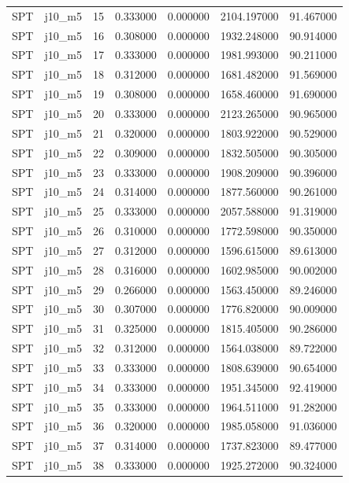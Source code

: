 \begin{tabular}{llrrrrr}
SPT & j10_m5 & 15 & 0.333000 & 0.000000 & 2104.197000 & 91.467000 \\
SPT & j10_m5 & 16 & 0.308000 & 0.000000 & 1932.248000 & 90.914000 \\
SPT & j10_m5 & 17 & 0.333000 & 0.000000 & 1981.993000 & 90.211000 \\
SPT & j10_m5 & 18 & 0.312000 & 0.000000 & 1681.482000 & 91.569000 \\
SPT & j10_m5 & 19 & 0.308000 & 0.000000 & 1658.460000 & 91.690000 \\
SPT & j10_m5 & 20 & 0.333000 & 0.000000 & 2123.265000 & 90.965000 \\
SPT & j10_m5 & 21 & 0.320000 & 0.000000 & 1803.922000 & 90.529000 \\
SPT & j10_m5 & 22 & 0.309000 & 0.000000 & 1832.505000 & 90.305000 \\
SPT & j10_m5 & 23 & 0.333000 & 0.000000 & 1908.209000 & 90.396000 \\
SPT & j10_m5 & 24 & 0.314000 & 0.000000 & 1877.560000 & 90.261000 \\
SPT & j10_m5 & 25 & 0.333000 & 0.000000 & 2057.588000 & 91.319000 \\
SPT & j10_m5 & 26 & 0.310000 & 0.000000 & 1772.598000 & 90.350000 \\
SPT & j10_m5 & 27 & 0.312000 & 0.000000 & 1596.615000 & 89.613000 \\
SPT & j10_m5 & 28 & 0.316000 & 0.000000 & 1602.985000 & 90.002000 \\
SPT & j10_m5 & 29 & 0.266000 & 0.000000 & 1563.450000 & 89.246000 \\
SPT & j10_m5 & 30 & 0.307000 & 0.000000 & 1776.820000 & 90.009000 \\
SPT & j10_m5 & 31 & 0.325000 & 0.000000 & 1815.405000 & 90.286000 \\
SPT & j10_m5 & 32 & 0.312000 & 0.000000 & 1564.038000 & 89.722000 \\
SPT & j10_m5 & 33 & 0.333000 & 0.000000 & 1808.639000 & 90.654000 \\
SPT & j10_m5 & 34 & 0.333000 & 0.000000 & 1951.345000 & 92.419000 \\
SPT & j10_m5 & 35 & 0.333000 & 0.000000 & 1964.511000 & 91.282000 \\
SPT & j10_m5 & 36 & 0.320000 & 0.000000 & 1985.058000 & 91.036000 \\
SPT & j10_m5 & 37 & 0.314000 & 0.000000 & 1737.823000 & 89.477000 \\
SPT & j10_m5 & 38 & 0.333000 & 0.000000 & 1925.272000 & 90.324000 \\

\end{tabular}
